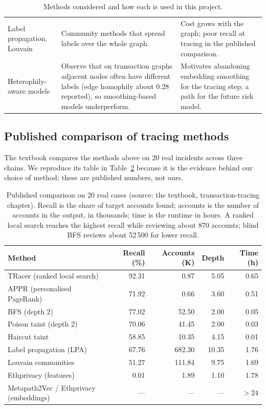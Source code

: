 \begin{table}[H]
\begin{tabular}{p{2.9cm} p{4.7cm} p{4.7cm}}
Label propagation, Louvain \cite{textbook} & Community methods that spread labels over the whole graph. & Cost grows with the graph; poor recall at tracing in the published comparison.\\
Heterophily-aware models \cite{textbook} & Observe that on transaction graphs adjacent nodes often have different labels (edge homophily about 0.28 reported), so smoothing-based models underperform. & Motivates abandoning embedding smoothing for the tracing step; a path for the future risk model.\\
\bottomrule
\end{tabular}
\caption{Methods considered and how each is used in this project.}
\label{tab:lit}
\end{table}

\subsection{Published comparison of tracing methods}
The textbook \cite{textbook} compares the methods above on 20 real incidents across three chains. We reproduce its table in Table~\ref{tab:bookbench} because it is the evidence behind our choice of method; these are published numbers, not ours.

\begin{table}[H]
\centering\small\singlespacing
\begin{tabular}{p{5.0cm} r r r r}
\toprule
\textbf{Method} & \textbf{Recall (\%)} & \textbf{Accounts (K)} & \textbf{Depth} & \textbf{Time (h)}\\
\midrule
TRacer (ranked local search) & 92.31 & 0.87 & 5.05 & 0.65\\
APPR (personalised PageRank) & 71.92 & 0.66 & 3.60 & 0.51\\
BFS (depth 2) & 77.02 & 52.50 & 2.00 & 0.05\\
Poison taint (depth 2) & 70.06 & 41.45 & 2.00 & 0.03\\
Haircut taint & 58.85 & 10.35 & 4.15 & 0.01\\
Label propagation (LPA) & 67.76 & 682.30 & 10.35 & 1.76\\
Louvain communities & 51.27 & 111.84 & 9.75 & 1.69\\
Ethprivacy (features) & 0.01 & 1.89 & 1.10 & 1.78\\
Metapath2Vec / Ethprivacy (embeddings) & --- & --- & --- & $>24$\\
\bottomrule
\end{tabular}
\caption{Published comparison on 20 real cases (source: the textbook, transaction-tracing chapter). Recall is the share of target accounts found; accounts is the number of accounts in the output, in thousands; time is the runtime in hours. A ranked local search reaches the highest recall while reviewing about 870 accounts; blind BFS reviews about 52\,500 for lower recall.}
\label{tab:bookbench}
\end{table}

